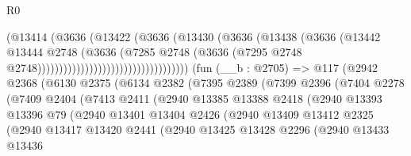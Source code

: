 \begin{lexlean}{R0}
\begin{coremodule}
                                                (@13414
                                                  (@3636
                                                    (@13422
                                                      (@3636
                                                        (@13430
                                                          (@3636
                                                            (@13438
                                                              (@3636
                                                                (@13442
                                                                  @13444
                                                                  @2748
                                                                  (@3636
                                                                    (@7285
                                                                      @2748
                                                                      (@3636
                                                                        (@7295
                                                                          @2748
                                                                          @2748)))))))))))))))))))))))))))))))))))
    (fun (__b : @2705) =>
    @117
      (@2942
        @2368
        (@6130
          @2375
          (@6134
            @2382
            (@7395
              @2389
              (@7399
                @2396
                (@7404
                  @2278
                  (@7409
                    @2404
                    (@7413
                      @2411
                      (@2940
                        @13385
                        @13388
                        @2418
                        (@2940
                          @13393
                          @13396
                          @79
                          (@2940
                            @13401
                            @13404
                            @2426
                            (@2940
                              @13409
                              @13412
                              @2325
                              (@2940
                                @13417
                                @13420
                                @2441
                                (@2940
                                  @13425
                                  @13428
                                  @2296
                                  (@2940
                                    @13433
                                    @13436

\end{coremodule}
\end{lexlean}
